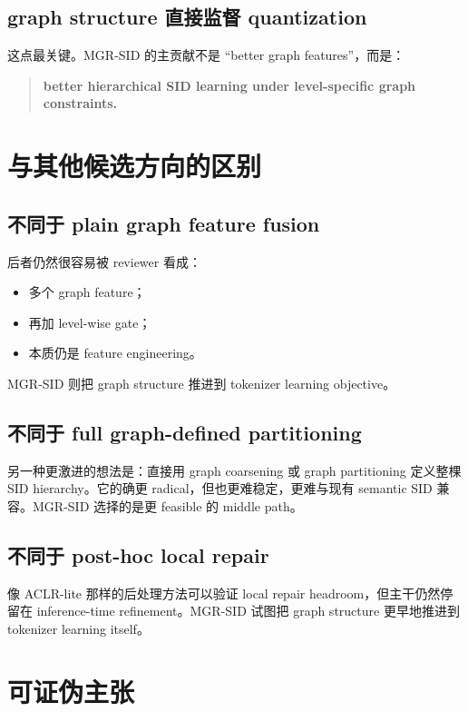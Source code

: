 \documentclass[11pt]{article}
\begin{document}
\subsection{graph structure 直接监督 quantization}

这点最关键。MGR-SID 的主贡献不是 ``better graph features''，而是：
\begin{quote}
\textbf{better hierarchical SID learning under level-specific graph constraints.}
\end{quote}

\section{与其他候选方向的区别}

\subsection{不同于 plain graph feature fusion}

后者仍然很容易被 reviewer 看成：
\begin{itemize}
  \item 多个 graph feature；
  \item 再加 level-wise gate；
  \item 本质仍是 feature engineering。
\end{itemize}

MGR-SID 则把 graph structure 推进到 tokenizer learning objective。

\subsection{不同于 full graph-defined partitioning}

另一种更激进的想法是：直接用 graph coarsening 或 graph partitioning 定义整棵 SID hierarchy。它的确更 radical，但也更难稳定，更难与现有 semantic SID 兼容。MGR-SID 选择的是更 feasible 的 middle path。

\subsection{不同于 post-hoc local repair}

像 ACLR-lite 那样的后处理方法可以验证 local repair headroom，但主干仍然停留在 inference-time refinement。MGR-SID 试图把 graph structure 更早地推进到 tokenizer learning itself。

\section{可证伪主张}
\end{document}
